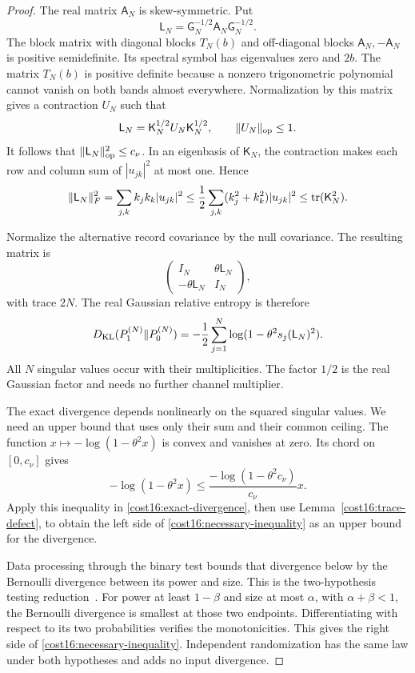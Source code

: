 \begin{proof}
The real matrix $\mathsf A_N$ is skew-symmetric. Put
\[
 \mathsf L_N=\mathsf G_N^{-1/2}\mathsf A_N\mathsf G_N^{-1/2}.
\]
The block matrix with diagonal blocks $T_N(b)$ and off-diagonal blocks $\mathsf A_N,-\mathsf A_N$ is positive semidefinite. Its spectral symbol has eigenvalues zero and $2b$. The matrix $T_N(b)$ is positive definite because a nonzero trigonometric polynomial cannot vanish on both bands almost everywhere. Normalization by this matrix gives a contraction $U_N$ such that
\[
 \mathsf L_N=\mathsf K_N^{1/2}U_N\mathsf K_N^{1/2},
 \qquad \|U_N\|_{\rm op}\le1.
\]
It follows that $\|\mathsf L_N\|_{\rm op}^2\le c_\nu$. In an eigenbasis of $\mathsf K_N$, the contraction makes each row and column sum of $|u_{jk}|^2$ at most one. Hence
\[
 \|\mathsf L_N\|_F^2
 =\sum_{j,k}k_jk_k|u_{jk}|^2
 \le\frac12\sum_{j,k}(k_j^2+k_k^2)|u_{jk}|^2
 \le\operatorname{tr}(\mathsf K_N^2).
\]

Normalize the alternative record covariance by the null covariance. The resulting matrix is
\[
 \begin{pmatrix}I_N&\theta\mathsf L_N\\-\theta\mathsf L_N&I_N\end{pmatrix},
\]
with trace $2N$. The real Gaussian relative entropy is therefore
\begin{equation}
 D_{\rm KL}(P_1^{(N)}\|P_0^{(N)})
 =-\frac12\sum_{j=1}^{N}
                   \log(1-\theta^2s_j(\mathsf L_N)^2).
 \label{cost16:exact-divergence}
\end{equation}
All $N$ singular values occur with their multiplicities. The factor $1/2$ is the real Gaussian factor and needs no further channel multiplier.

The exact divergence depends nonlinearly on the squared singular values. We need an upper bound that uses only their sum and their common ceiling. The function $x\mapsto-\log(1-\theta^2x)$ is convex and vanishes at zero. Its chord on $[0,c_\nu]$ gives
\[
 -\log(1-\theta^2x)
 \le\frac{-\log(1-\theta^2c_\nu)}{c_\nu}x.
\]
Apply this inequality in \eqref{cost16:exact-divergence}, then use Lemma~\ref{cost16:trace-defect}, to obtain the left side of \eqref{cost16:necessary-inequality} as an upper bound for the divergence.

Data processing through the binary test bounds that divergence below by the Bernoulli divergence between its power and size. This is the two-hypothesis testing reduction~\cite{lecam1986}. For power at least $1-\beta$ and size at most $\alpha$, with $\alpha+\beta<1$, the Bernoulli divergence is smallest at those two endpoints. Differentiating with respect to its two probabilities verifies the monotonicities. This gives the right side of \eqref{cost16:necessary-inequality}. Independent randomization has the same law under both hypotheses and adds no input divergence.
\end{proof}


